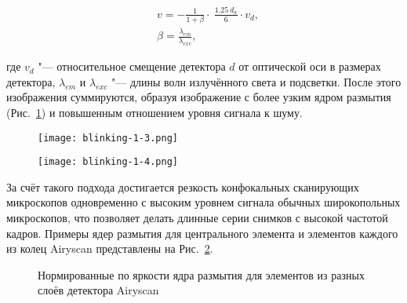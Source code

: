 \begin{subequations}
	\begin{align}
		&v=-\frac{1}{1+\beta}\cdot\ \frac{1.25\ d_a}{6}\cdot v_d,  \nonumber \\
		&\beta=\frac{\lambda_{em}}{\lambda_{exc}},  \nonumber
	\end{align}
\end{subequations}

\noindent где $v_d$ "--- относительное смещение детектора $d$ от оптической оси в размерах детектора, $\lambda_{em}$ и $\lambda_{exc}$ "--- длины волн излучённого света и подсветки. После этого изображения суммируются, образуя изображение с более узким ядром размытия (Рис.~\ref{fig:blinking-psf-comparison}) и повышенным отношением уровня сигнала к шуму.

\begin{figure}[ht]
	\centering
	\hfill
	\begin{minipage}{0.45\textwidth}
		\centering
		\texttt{[image: blinking-1-3.png]}
		\label{fig:blinking-airyscan}
	\end{minipage} \hfill
	\begin{minipage}{0.45\textwidth}
		\centering
		\texttt{[image: blinking-1-4.png]}
		\label{fig:blinking-psf-comparison}
	\end{minipage}
	\hfill
\end{figure}

За счёт такого подхода достигается резкость конфокальных сканирующих микроскопов одновременно с высоким уровнем сигнала обычных широкопольных микроскопов, что позволяет делать длинные серии снимков с высокой частотой кадров. Примеры ядер размытия для центрального элемента и элементов каждого из колец Airyscan представлены на Рис.~\ref{fig:blinking-airyscan-psf-samples}.

\begin{figure}[ht]
	\caption{Нормированные по яркости ядра размытия для элементов из разных слоёв детектора Airyscan}
	\label{fig:blinking-airyscan-psf-samples}
\end{figure}

